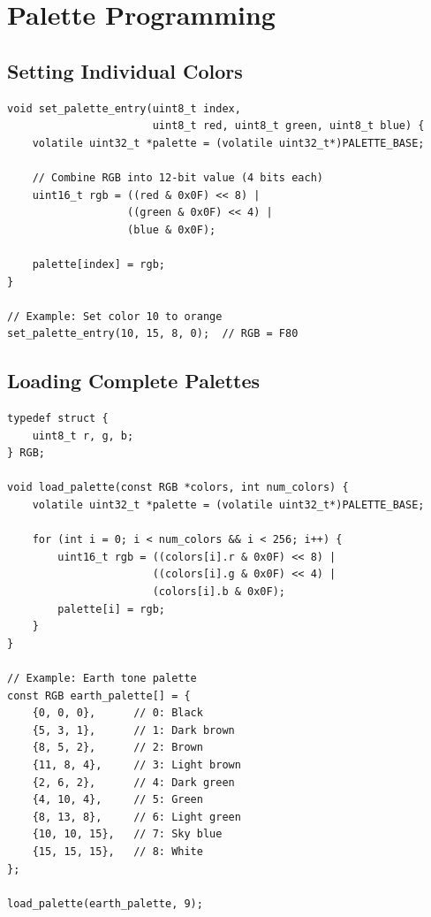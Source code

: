 \documentclass[11pt,letterpaper]{report}
\begin{document}
\section{Palette Programming}

\subsection{Setting Individual Colors}

\begin{lstlisting}[style=c,caption={Setting Palette Entries}]
void set_palette_entry(uint8_t index, 
                       uint8_t red, uint8_t green, uint8_t blue) {
    volatile uint32_t *palette = (volatile uint32_t*)PALETTE_BASE;
    
    // Combine RGB into 12-bit value (4 bits each)
    uint16_t rgb = ((red & 0x0F) << 8) | 
                   ((green & 0x0F) << 4) | 
                   (blue & 0x0F);
    
    palette[index] = rgb;
}

// Example: Set color 10 to orange
set_palette_entry(10, 15, 8, 0);  // RGB = F80
\end{lstlisting}

\subsection{Loading Complete Palettes}

\begin{lstlisting}[style=c,caption={Loading a Full Palette}]
typedef struct {
    uint8_t r, g, b;
} RGB;

void load_palette(const RGB *colors, int num_colors) {
    volatile uint32_t *palette = (volatile uint32_t*)PALETTE_BASE;
    
    for (int i = 0; i < num_colors && i < 256; i++) {
        uint16_t rgb = ((colors[i].r & 0x0F) << 8) | 
                       ((colors[i].g & 0x0F) << 4) | 
                       (colors[i].b & 0x0F);
        palette[i] = rgb;
    }
}

// Example: Earth tone palette
const RGB earth_palette[] = {
    {0, 0, 0},      // 0: Black
    {5, 3, 1},      // 1: Dark brown
    {8, 5, 2},      // 2: Brown
    {11, 8, 4},     // 3: Light brown
    {2, 6, 2},      // 4: Dark green
    {4, 10, 4},     // 5: Green
    {8, 13, 8},     // 6: Light green
    {10, 10, 15},   // 7: Sky blue
    {15, 15, 15},   // 8: White
};

load_palette(earth_palette, 9);
\end{lstlisting}
\end{document}
